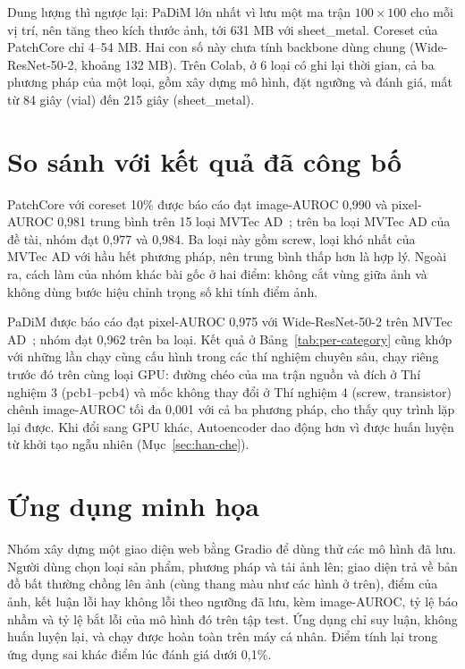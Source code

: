 Dung lượng thì ngược lại: PaDiM lớn nhất vì lưu một ma trận $100\times100$ cho mỗi vị trí, nên tăng theo kích thước
ảnh, tới 631 MB với sheet\_metal. Coreset của PatchCore chỉ 4--54 MB. Hai con số này chưa tính backbone dùng chung
(Wide-ResNet-50-2, khoảng 132 MB). Trên Colab, ở 6 loại có ghi lại thời gian, cả ba phương pháp của một loại, gồm xây dựng mô
hình, đặt ngưỡng và đánh giá, mất từ 84 giây (vial) đến 215 giây (sheet\_metal).

\section{So sánh với kết quả đã công bố}

PatchCore với coreset 10\% được báo cáo đạt image-AUROC 0,990 và pixel-AUROC 0,981 trung bình trên 15 loại MVTec
AD~\cite{rothTotalRecallIndustrial2022}; trên ba loại MVTec AD của đề tài, nhóm đạt 0,977 và 0,984. Ba loại này gồm
screw, loại khó nhất của MVTec AD với hầu hết phương pháp, nên trung bình thấp hơn là hợp lý. Ngoài ra, cách làm của
nhóm khác bài gốc ở hai điểm: không cắt vùng giữa ảnh và không dùng bước hiệu chỉnh trọng số khi tính điểm ảnh.

PaDiM được báo cáo đạt pixel-AUROC 0,975 với Wide-ResNet-50-2 trên MVTec AD~\cite{defardPaDiMPatchDistribution2021};
nhóm đạt 0,962 trên ba loại. Kết quả ở Bảng~\ref{tab:per-category} cũng khớp với những lần chạy cùng cấu hình
trong các thí nghiệm chuyên sâu, chạy riêng trước đó trên cùng loại GPU: đường chéo của ma trận nguồn và đích ở Thí
nghiệm 3 (pcb1--pcb4) và mốc không thay đổi ở Thí nghiệm 4 (screw, transistor) chênh image-AUROC tối đa 0,001 với cả
ba phương pháp, cho thấy quy trình lặp lại được. Khi đổi sang GPU khác, Autoencoder dao động hơn vì được huấn luyện từ
khởi tạo ngẫu nhiên (Mục~\ref{sec:han-che}).

\section{Ứng dụng minh họa}
\label{sec:demo}

Nhóm xây dựng một giao diện web bằng Gradio để dùng thử các mô hình đã lưu. Người dùng chọn loại sản phẩm, phương pháp
và tải ảnh lên; giao diện trả về bản đồ bất thường chồng lên ảnh (cùng thang màu như các hình ở trên), điểm của ảnh,
kết luận lỗi hay không lỗi theo ngưỡng đã lưu, kèm image-AUROC, tỷ lệ báo nhầm và tỷ lệ bắt lỗi của mô hình đó trên
tập test. Ứng dụng chỉ suy luận, không huấn luyện lại, và chạy được hoàn toàn trên máy cá nhân. Điểm tính lại trong
ứng dụng sai khác điểm lúc đánh giá dưới 0,1\%.

